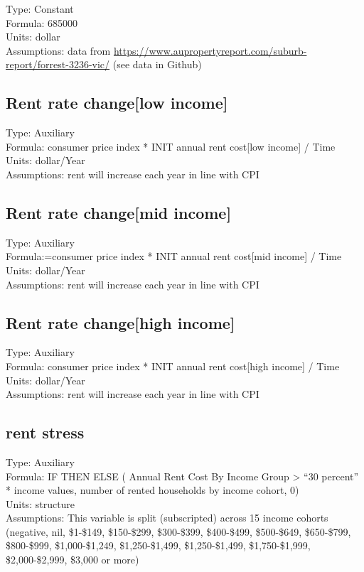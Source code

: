 \documentclass[
  11pt,
]{book}
\begin{document}
Type: Constant\\
Formula: 685000\\
Units: dollar\\
Assumptions: data from \url{https://www.aupropertyreport.com/suburb-report/forrest-3236-vic/} (see data in Github)

\hypertarget{rent-rate-changelow-income}{%
\subsection{Rent rate change{[}low income{]}}\label{rent-rate-changelow-income}}

Type: Auxiliary\\
Formula: consumer price index * INIT annual rent cost{[}low income{]} / Time\\
Units: dollar/Year\\
Assumptions: rent will increase each year in line with CPI

\hypertarget{rent-rate-changemid-income}{%
\subsection{Rent rate change{[}mid income{]}}\label{rent-rate-changemid-income}}

Type: Auxiliary\\
Formula:=consumer price index * INIT annual rent cost{[}mid income{]} / Time\\
Units: dollar/Year\\
Assumptions: rent will increase each year in line with CPI

\hypertarget{rent-rate-changehigh-income}{%
\subsection{Rent rate change{[}high income{]}}\label{rent-rate-changehigh-income}}

Type: Auxiliary\\
Formula: consumer price index * INIT annual rent cost{[}high income{]} / Time\\
Units: dollar/Year\\
Assumptions: rent will increase each year in line with CPI

\hypertarget{rent-stress}{%
\subsection{rent stress}\label{rent-stress}}

Type: Auxiliary\\
Formula: IF THEN ELSE ( Annual Rent Cost By Income Group \textgreater{} ``30 percent'' * income values, number of rented households by income cohort, 0)\\
Units: structure\\
Assumptions: This variable is split (subscripted) across 15 income cohorts (negative, nil, \$1-\$149, \$150-\$299, \$300-\$399, \$400-\$499, \$500-\$649, \$650-\$799, \$800-\$999, \$1,000-\$1,249, \$1,250-\$1,499, \$1,250-\$1,499, \$1,750-\$1,999, \$2,000-\$2,999, \$3,000 or more)
\end{document}
